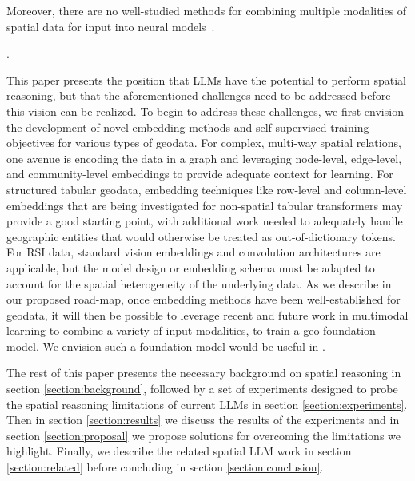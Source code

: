 Moreover, there are no well-studied methods for combining multiple modalities of spatial data for input into neural models~\cite{Xue2023}.

 \cite{Trappolini2023, Fei2022}.

This paper presents the position that LLMs have the potential to perform spatial reasoning, but that the aforementioned challenges need to be addressed before this vision can be realized.
%
To begin to address these challenges, we first envision the development of novel embedding methods and self-supervised training objectives for various types of geodata.
%
For complex, multi-way spatial relations, one avenue is encoding the data in a graph and leveraging node-level, edge-level, and community-level embeddings to provide adequate context for learning.
For structured tabular geodata, embedding techniques like row-level and column-level embeddings that are being investigated for non-spatial tabular transformers may provide a good starting point, with additional work needed to adequately handle geographic entities that would otherwise be treated as out-of-dictionary tokens.
For RSI data, standard vision embeddings and convolution architectures are applicable, but the model design or embedding schema must be adapted to account for the spatial heterogeneity of the underlying data.
%
As we describe in our proposed road-map, once embedding methods have been well-established for geodata, it will then be possible to leverage recent and future work in multimodal learning to combine a variety of input modalities, to train a geo foundation model.
%
We envision such a foundation model would be useful in .

The rest of this paper presents the necessary background on spatial reasoning in section \ref{section:background}, followed by a set of experiments designed to probe the spatial reasoning limitations of current LLMs in section \ref{section:experiments}.
Then in section \ref{section:results} we discuss the results of the experiments and in section \ref{section:proposal} we propose solutions for overcoming the limitations we highlight.
Finally, we describe the related spatial LLM work in section \ref{section:related} before concluding in section \ref{section:conclusion}. 


